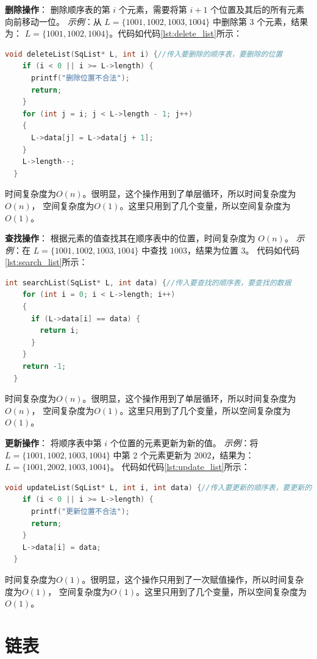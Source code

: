 \documentclass[lang=cn,newtx,10pt,scheme=chinese]{../elegantbook}
\begin{document}
\textbf{删除操作}：
删除顺序表的第 $i$ 个元素，需要将第 $i+1$ 个位置及其后的所有元素向前移动一位。
\textit{示例}：从 $L = \{1001, 1002, 1003, 1004\}$ 中删除第 3 个元素，结果为：
$L = \{1001, 1002, 1004\}$。代码如代码\ref{lst:delete_list}所示：
\begin{lstlisting}[language=C++, caption={顺序表的删除示例代码}, label={lst:delete_list}]
  void deleteList(SqList* L, int i) {//传入要删除的顺序表，要删除的位置
    if (i < 0 || i >= L->length) {
      printf("删除位置不合法");
      return;
    }
    for (int j = i; j < L->length - 1; j++)
    {
      L->data[j] = L->data[j + 1];
    }
    L->length--;
  }
  \end{lstlisting}
时间复杂度为$O(n)$。很明显，这个操作用到了单层循环，所以时间复杂度为$O(n)$，
空间复杂度为$O(1)$。这里只用到了几个变量，所以空间复杂度为$O(1)$。

\textbf{查找操作}：
根据元素的值查找其在顺序表中的位置，时间复杂度为 $O(n)$。
\textit{示例}：在 $L = \{1001, 1002, 1003, 1004\}$ 中查找 $1003$，结果为位置 3。
代码如代码\ref{lst:search_list}所示：
\begin{lstlisting}[language=C++, caption={顺序表的查找示例代码}, label={lst:search_list}]
  int searchList(SqList* L, int data) {//传入要查找的顺序表，要查找的数据
    for (int i = 0; i < L->length; i++)
    {
      if (L->data[i] == data) {
        return i;
      }
    }
    return -1;
  }
  \end{lstlisting}
时间复杂度为$O(n)$。很明显，这个操作用到了单层循环，所以时间复杂度为$O(n)$，
空间复杂度为$O(1)$。这里只用到了几个变量，所以空间复杂度为$O(1)$。

\textbf{更新操作}：
将顺序表中第 $i$ 个位置的元素更新为新的值。
\textit{示例}：将 $L = \{1001, 1002, 1003, 1004\}$ 中第 2 个元素更新为 $2002$，结果为：
$L = \{1001, 2002, 1003, 1004\}$。
代码如代码\ref{lst:update_list}所示：
\begin{lstlisting}[language=C++, caption={顺序表的更新示例代码}, label={lst:update_list}]
  void updateList(SqList* L, int i, int data) {//传入要更新的顺序表，要更新的位置，要更新的数据
    if (i < 0 || i >= L->length) {
      printf("更新位置不合法");
      return;
    }
    L->data[i] = data;
  }
  \end{lstlisting}
时间复杂度为$O(1)$。很明显，这个操作只用到了一次赋值操作，所以时间复杂度为$O(1)$，
空间复杂度为$O(1)$。这里只用到了几个变量，所以空间复杂度为$O(1)$。

\section{链表}
\end{document}
